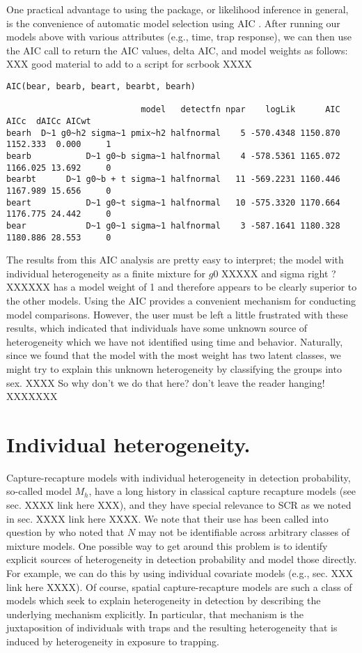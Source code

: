 One practical advantage to using the \secr package, or likelihood
inference in general, is the convenience of automatic model selection
using AIC \citep{burnham_anderson:xxxxx}.
After running our models above with various attributes (e.g., time,
trap response), we can then use the AIC call to return the AIC values,
delta AIC, and model weights as follows: XXX good material to add to a
script for scrbook XXXX
{\small
\begin{verbatim}
AIC(bear, bearb, beart, bearbt, bearh)

                           model   detectfn npar    logLik      AIC     AICc  dAICc AICwt
bearh  D~1 g0~h2 sigma~1 pmix~h2 halfnormal    5 -570.4348 1150.870 1152.333  0.000     1
bearb           D~1 g0~b sigma~1 halfnormal    4 -578.5361 1165.072 1166.025 13.692     0
bearbt      D~1 g0~b + t sigma~1 halfnormal   11 -569.2231 1160.446 1167.989 15.656     0
beart           D~1 g0~t sigma~1 halfnormal   10 -575.3320 1170.664 1176.775 24.442     0
bear            D~1 g0~1 sigma~1 halfnormal    3 -587.1641 1180.328 1180.886 28.553     0
\end{verbatim}
}
The results from this AIC analysis are pretty easy to interpret; the model
with individual heterogeneity as a finite mixture for $g0$ XXXXX and
sigma right ?XXXXXX
 has a 
model weight of 1 and therefore appears to be clearly superior to the
other models.  Using the AIC provides a convenient mechanism for
conducting model comparisons.  However, the user must be left a little
frustrated with these results, which indicated that individuals have
some unknown source of heterogeneity which we have not identified
using time and behavior.  Naturally, since we found that the model
with the most weight has two latent classes, we might try to explain
this unknown heterogeneity by classifying the groups into sex. 
XXXX So why don't we do that here? don't leave the reader hanging! XXXXXXX




\section{Individual heterogeneity.}

Capture-recapture models with individual heterogeneity in detection
probability, so-called model $M_{h}$,  have a long history in classical capture recapture models
(see sec. XXXX link here XXX), and they have special relevance to 
SCR
as we noted in sec. XXXX link here XXXX.
We note that their use has been called into question by
\citet{link:2003} who noted that $N$ may not be identifiable across
arbitrary classes of mixture models.  One possible way to get around
this problem is to identify explicit sources of heterogeneity in
detection probability and model those directly. For example, we can do
this by using individual covariate models (e.g., sec. XXX link here
XXXX). Of
course, spatial capture-recapture models are such a class of models
which seek to explain heterogeneity in detection by describing the
underlying mechanism explicitly. In particular, that mechanism is the
juxtaposition of individuals with traps and the resulting
heterogeneity that is induced by heterogeneity in exposure to
trapping.

